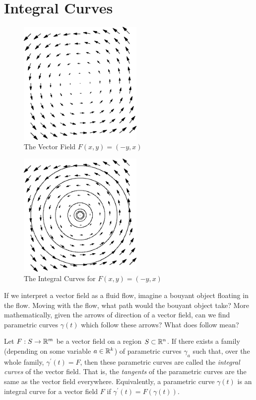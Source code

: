 \documentclass[fleqn,letterpaper]{report}
\begin{document}
\section{Integral Curves}
\label{integral-curves}

\begin{figure}[t]
\centering
\includegraphics[width=6cm]{figure02.eps}
\caption{The Vector Field $F(x,y) = (-y,x)$}
\label{figure-vector-field3}
\end{figure}

\begin{figure}[t]
\centering
\includegraphics[width=6cm]{figure03.eps}
\caption{The Integral Curves for $F(x,y) = (-y,x)$}
\label{figure-vector-field3-curves}
\end{figure}

If we interpret a vector field as a fluid flow, imagine a
bouyant object floating in the flow. Moving with the flow,
what path would the bouyant object take? More mathematically, 
given the arrows of direction of a vector field, can we find parametric
curves $\gamma(t)$ which follow these arrows? What does
follow mean? 

\begin{defn}
Let $F: S \rightarrow \mathbb{R}^m$ be a vector field on a region $S
\subset \mathbb{R}^n$. If there exists a family (depending on some
variable $a \in \mathbb{R}^k$) of parametric curves $\gamma_a$ such
that, over the whole family, $\gamma^\prime(t) = F$, then
these parametric curves are called the \emph{integral curves}
of the vector field. That is, the \emph{tangents} of the
parametric curves are the same as the vector field everywhere.
Equivalently, a parametric curve $\gamma(t)$ is an integral
curve for a vector field $F$ if $\gamma^\prime(t) =
F(\gamma(t))$. 
\end{defn}
\end{document}
